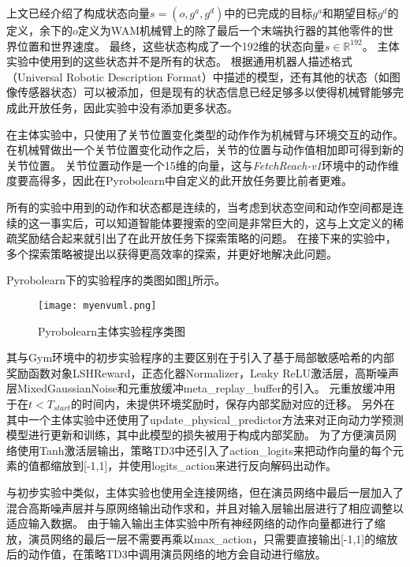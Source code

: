 上文已经介绍了构成状态向量$s=(o, g^a, g^d)$中的已完成的目标$g^a$和期望目标$g^d$的定义，余下的$o$定义为WAM机械臂上的除了最后一个末端执行器的其他零件的世界位置和世界速度。
最终，这些状态构成了一个192维的状态向量$s\in \mathbb R^{192}$。
主体实验中使用到的这些状态并不是所有的状态。
根据通用机器人描述格式（Universal Robotic Description Format\cite{conf/irc/KangKK19}）中描述的模型，还有其他的状态（如图像传感器状态）可以被添加，但是现有的状态信息已经足够多以使得机械臂能够完成此开放任务，因此实验中没有添加更多状态。

在主体实验中，只使用了关节位置变化类型的动作作为机械臂与环境交互的动作。
在机械臂做出一个关节位置变化动作之后，关节的位置与动作值相加即可得到新的关节位置。
关节位置动作是一个15维的向量，这与\emph{FetchReach-v1}环境中的动作维度要高得多，因此在Pyrobolearn中自定义的此开放任务要比前者更难。

所有的实验中用到的动作和状态都是连续的，当考虑到状态空间和动作空间都是连续的这一事实后，可以知道智能体要搜索的空间是非常巨大的，这与上文定义的稀疏奖励结合起来就引出了在此开放任务下探索策略的问题。
在接下来的实验中，多个探索策略被提出以获得更高效率的探索，并更好地解决此问题。

Pyrobolearn下的实验程序的类图如图\ref{myenvuml}所示。
    \begin{figure}[htpb]
        \centering
        \texttt{[image: myenvuml.png]}
        \caption{Pyrobolearn主体实验程序类图}
        \label{myenvuml}
    \end{figure}
    其与Gym环境中的初步实验程序的主要区别在于引入了基于局部敏感哈希的内部奖励函数对象LSHReward，正态化器Normalizer\cite{DBLP:journals/corr/HasseltGHS16}，Leaky ReLU激活层\cite{DBLP:journals/corr/XuWCL15}，高斯噪声层MixedGaussianNoise和元重放缓冲meta\_replay\_buffer的引入。
    元重放缓冲用于在$t<T_{start}$的时间内，未提供环境奖励时，保存内部奖励对应的迁移。
    另外在其中一个主体实验中还使用了update\_physical\_predictor方法来对正向动力学预测模型进行更新和训练，其中此模型的损失被用于构成内部奖励。
    为了方便演员网络使用Tanh激活层\cite{DBLP:journals/corr/abs-1811-03378}输出，策略TD3中还引入了action\_logits来把动作向量的每个元素的值都缩放到[-1,1]，并使用logits\_action来进行反向解码出动作。

    与初步实验中类似，主体实验也使用全连接网络\cite{1165576,novikoff62convergence}，但在演员网络中最后一层加入了混合高斯噪声层并与原网络输出动作求和，并且对输入层输出层进行了相应调整以适应输入数据。
    由于输入输出主体实验中所有神经网络的动作向量都进行了缩放，演员网络的最后一层不需要再乘以max\_action，只需要直接输出[-1,1]的缩放后的动作值，在策略TD3中调用演员网络的地方会自动进行缩放。

